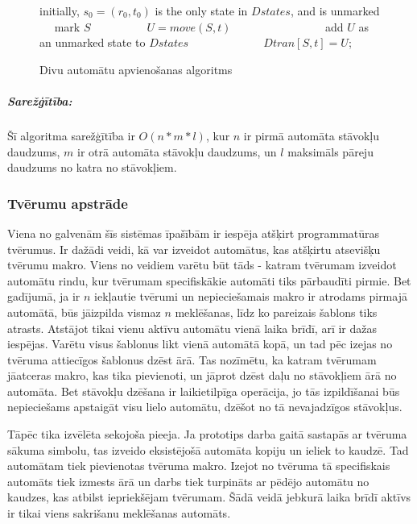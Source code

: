 \begin{figure}[H]
  \begin{algorithmic}
  \State initially, $s_0 = (r_0, t_0)$ is the only state in $Dstates$, and is unmarked
      \State mark $S$
       
          \State $U = move (S, t)$
              \State add $U$ as an unmarked state to $Dstates$
          \EndIf
          \State $Dtran [S, t] = U$;
      \EndFor
  \EndWhile
  \end{algorithmic}
  \caption{\label{fig:uni_algorithm}Divu automātu apvienošanas algoritms}
\end{figure}

\subparagraph{Sarežģītība:}
Šī algoritma sarežģītība ir $O(n*m*l)$, kur  $n$ ir pirmā automāta stāvokļu daudzums, $m$ ir otrā automāta stāvokļu daudzums, un $l$ maksimāls pāreju daudzums no katra no stāvokļiem.

\subsubsection{Tvērumu apstrāde}

Viena no galvenām šīs sistēmas īpašībām ir iespēja atšķirt programmatūras tvērumus. Ir dažādi veidi, kā var izveidot automātus, kas atšķirtu atsevišķu tvērumu makro. Viens no veidiem varētu būt tāds - katram tvērumam izveidot automātu rindu, kur tvērumam specifiskākie automāti tiks pārbaudīti pirmie. Bet gadījumā, ja ir $n$ iekļautie tvērumi un nepieciešamais makro ir atrodams pirmajā automātā, būs jāizpilda vismaz $n$ meklēšanas, līdz ko pareizais šablons tiks atrasts. Atstājot tikai vienu aktīvu automātu vienā laika brīdī, arī ir dažas iespējas. Varētu visus šablonus likt vienā automātā kopā, un tad pēc izejas no tvēruma attiecīgos šablonus dzēst ārā. Tas nozīmētu, ka katram tvērumam jāatceras makro, kas tika pievienoti, un jāprot dzēst daļu no stāvokļiem ārā no automāta. Bet stāvokļu dzēšana ir laikietilpīga operācija, jo tās izpildīšanai būs nepieciešams apstaigāt visu lielo automātu, dzēšot no tā nevajadzīgos stāvokļus.

Tāpēc tika izvēlēta sekojoša pieeja. Ja prototips darba gaitā sastapās ar tvēruma sākuma simbolu, tas izveido eksistējošā automāta kopiju un ieliek to kaudzē. Tad automātam tiek pievienotas tvēruma makro. Izejot no tvēruma tā specifiskais automāts tiek izmests ārā un darbs tiek turpināts ar pēdējo automātu no kaudzes, kas atbilst iepriekšējam tvērumam. Šādā veidā jebkurā laika brīdī aktīvs ir tikai viens sakrišanu meklēšanas automāts.

